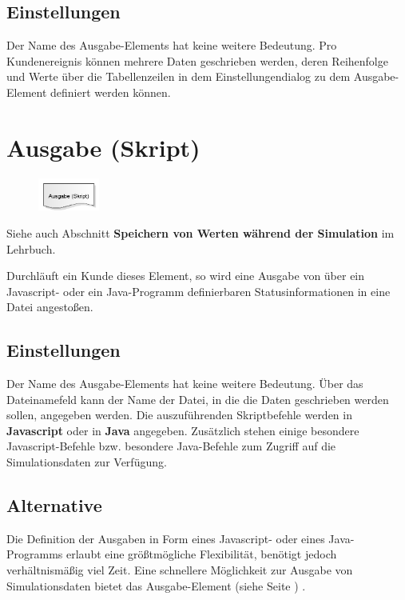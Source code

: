 \subsection*{Einstellungen}

Der Name des Ausgabe-Elements hat keine weitere Bedeutung. Pro Kundenereignis können mehrere Daten
geschrieben werden, deren Reihenfolge und Werte über die Tabellenzeilen in dem Einstellungendialog zu
dem Ausgabe-Element definiert werden können.


\section{Ausgabe (Skript)}
\label{ref:ModelElementOutputJS}

\begin{figure}
\vspace{-22pt}
\includegraphics[width=2cm]{imageModelElementOutputJS.png}
\vspace{-22pt}
\end{figure}

Siehe auch Abschnitt \textbf{Speichern von Werten während der Simulation} im Lehrbuch.

Durchläuft ein Kunde dieses Element, so wird eine Ausgabe von über ein Javascript-
oder ein Java-Programm definierbaren Statusinformationen in eine Datei angestoßen.

\subsection*{Einstellungen}

Der Name des Ausgabe-Elements hat keine weitere Bedeutung. Über das Dateinamefeld kann der Name der Datei,
in die die Daten geschrieben werden sollen, angegeben werden. Die auszuführenden Skriptbefehle werden in
\textbf{Javascript} oder in \textbf{Java} angegeben. Zusätzlich stehen einige
besondere Javascript-Befehle bzw. besondere Java-Befehle 
zum Zugriff auf die Simulationsdaten zur Verfügung.

\subsection*{Alternative}

Die Definition der Ausgaben in Form eines Javascript- oder eines Java-Programms erlaubt eine größtmögliche Flexibilität,
benötigt jedoch verhältnismäßig viel Zeit. Eine schnellere Möglichkeit zur Ausgabe von Simulationsdaten
bietet das Ausgabe-Element (siehe Seite \pageref{ref:ModelElementOutput}) .


